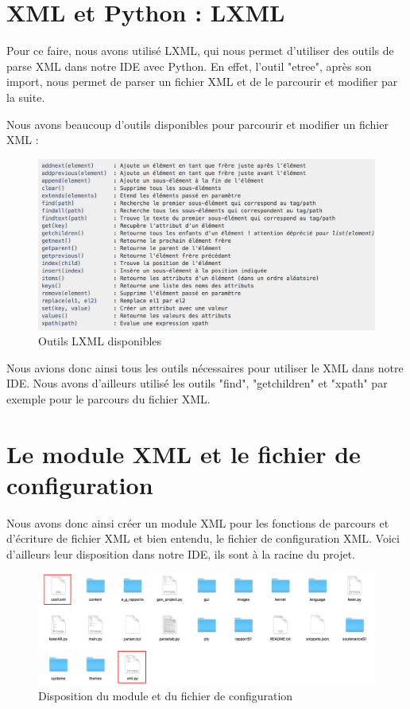 \documentclass[a4paper,12pt]{article}
\begin{document}
\section{XML et Python : LXML}

Pour ce faire, nous avons utilisé LXML, qui nous permet d'utiliser des outils de parse XML dans notre IDE avec Python. En effet, l'outil "etree", après son import, nous permet de parser un fichier XML et de le parcourir et modifier par la suite.
		
Nous avons beaucoup d'outils disponibles pour parcourir et modifier un fichier XML : 

\begin{figure}[h!]
			\begin{center}
				\includegraphics[scale=0.6]{images/lxml.png}
				\caption{Outils LXML disponibles}
			\end{center}
		\end{figure}

Nous avions donc ainsi tous les outils nécessaires pour utiliser le XML dans notre IDE. Nous avons d'ailleurs utilisé les outils "find", "getchildren" et "xpath" par exemple pour le parcours du fichier XML.

\section{Le module XML et le fichier de configuration}

Nous avons donc ainsi créer un module XML pour les fonctions de parcours et d'écriture de fichier XML et bien entendu, le fichier de configuration XML. Voici d'ailleurs leur disposition dans notre IDE, ils sont à la racine du projet.

\newpage

\begin{figure}[h!]
			\begin{center}
				\includegraphics[scale=0.23]{images/dossier.png}
				\caption{Disposition du module et du fichier de configuration}
			\end{center}
		\end{figure}
		
\end{document}
